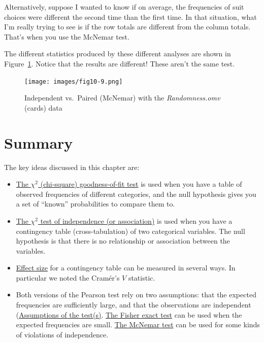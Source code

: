 \documentclass[
  a4paper,
]{book}
\providecommand{\tightlist}{%
  \setlength{\itemsep}{0pt}\setlength{\parskip}{0pt}}\usepackage{longtable,booktabs,array}
\begin{document}
Alternatively, suppose I wanted to know if on average, the frequencies
of suit choices were different the second time than the first time. In
that situation, what I'm really trying to see is if the row totals are
different from the column totals. That's when you use the McNemar test.

The different statistics produced by these different analyses are shown
in Figure~\ref{fig-fig10-9}. Notice that the results are different!
These aren't the same test.

\begin{figure}

\texttt{[image: images/fig10-9.png]} \hfill{}

\caption{\label{fig-fig10-9}Independent vs.~Paired (McNemar) with the
\emph{Randomness.omv} (cards) data}

\end{figure}

\hypertarget{summary-8}{%
\section{Summary}\label{summary-8}}

The key ideas discussed in this chapter are:

\begin{itemize}
\tightlist
\item
  \protect\hyperlink{the-chi2-chi-square-goodness-of-fit-test}{The
  \(\chi^2\) (chi-square) goodness-of-fit test} is used when you have a
  table of observed frequencies of different categories, and the null
  hypothesis gives you a set of ``known'' probabilities to compare them
  to.
\item
  \protect\hyperlink{the-chi2-test-of-independence-or-association}{The
  \(\chi^2\) test of independence (or association)} is used when you
  have a contingency table (cross-tabulation) of two categorical
  variables. The null hypothesis is that there is no relationship or
  association between the variables.
\item
  \protect\hyperlink{effect-size}{Effect size} for a contingency table
  can be measured in several ways. In particular we noted the Cramér's
  \(V\) statistic.
\item
  Both versions of the Pearson test rely on two assumptions: that the
  expected frequencies are sufficiently large, and that the observations
  are independent
  (\protect\hyperlink{assumptions-of-the-tests}{Assumptions of the
  test(s)}. \protect\hyperlink{the-fisher-exact-test}{The Fisher exact
  test} can be used when the expected frequencies are small.
  \protect\hyperlink{sec-The-McNemar-test}{The McNemar test} can be used
  for some kinds of violations of independence.
\end{itemize}
\end{document}
